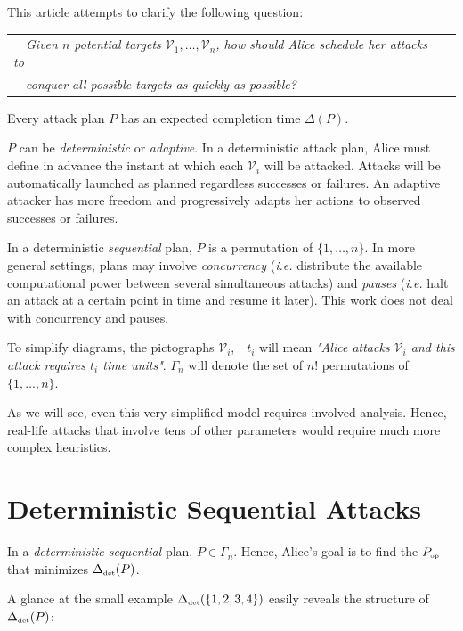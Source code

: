 \documentclass[11pt]{llncs}
\newcommand{\atk}{\begin{turn}{130}{\scriptsize \Lightning}\end{turn}}
\newcommand{\tk}{\raisebox{1ex}{\atk}}
\newcommand{\LL}[2]{\mbox{\tk $\mathcal{V}_{#1}$,~{\scriptsize \StopWatchEnd} #2}}
\begin{document}
This article attempts to clarify the following question:\smallskip

\begin{center}
\begin{tabular}{|l|}\hline
~~{\sl Given $n$ potential targets $\mathcal{V}_1,\ldots,\mathcal{V}_n$, how should Alice schedule her attacks to}~~\\
~~{\sl conquer all possible targets as quickly as possible?}~~\\\hline
\end{tabular}
\end{center}

Every attack plan $P$ has an expected completion time $\Delta(P)$.\smallskip

$P$ can be {\sl deterministic} or {\sl adaptive}. In a deterministic attack plan, Alice must define in advance the instant at which each $\mathcal{V}_i$ will be attacked. Attacks will be automatically launched as planned regardless successes or failures. An adaptive attacker has more freedom and progressively adapts her actions to observed successes or failures.\smallskip

In a deterministic {\sl sequential} plan, $P$ is a permutation of $\{1,\ldots,n\}$. In more general settings, plans may involve {\sl concurrency} ({\sl i.e.} distribute the available computational power between several simultaneous attacks) and {\sl pauses} ({\sl i.e.} halt an attack at a certain point in time and resume it later). This work does not deal with concurrency and pauses.\smallskip

To simplify diagrams, the pictographs \LL{i}{$t_i$} will mean {\sl "Alice attacks $\mathcal{V}_i$ and this attack requires $t_i$ time units"}. $\Gamma_n$ will denote the set of $n!$ permutations of $\{1,\ldots,n\}$.

As we will see, even this very simplified model requires involved analysis. Hence, real-life attacks that involve tens of other parameters would require much more complex heuristics.

\section{Deterministic Sequential Attacks}

In a {\sl deterministic sequential} plan, $P\in\Gamma_n$. Hence, Alice's goal is to find the $P_{\mbox{{\tiny op}}}$ that minimizes $\Delta_{\mbox{{\tiny det}}}(P)$.\smallskip

A glance at the small example $\Delta_{\mbox{{\tiny det}}}(\{1,2,3,4\})$ easily reveals the structure of $\Delta_{\mbox{{\tiny det}}}(P)$:
\end{document}
